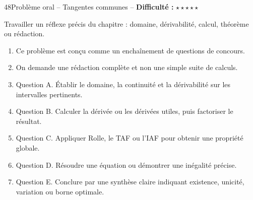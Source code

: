 \documentclass[11pt,a4paper]{article}
\newcommand{\etoiles}[1]{\textbf{Difficulté :} #1}
\begin{document}
\begin{exobox}{48}{Problème oral -- Tangentes communes -- \etoiles{$\star\star\star\star\star$}}

\begin{objectifbox}
Travailler un réflexe précis du chapitre : domaine, dérivabilité, calcul, théorème ou rédaction.
\end{objectifbox}

\begin{enumerate}

\item Ce problème est conçu comme un enchaînement de questions de concours.

\item On demande une rédaction complète et non une simple suite de calculs.

\item Question A. Établir le domaine, la continuité et la dérivabilité sur les intervalles pertinents.

\item Question B. Calculer la dérivée ou les dérivées utiles, puis factoriser le résultat.

\item Question C. Appliquer Rolle, le TAF ou l'IAF pour obtenir une propriété globale.

\item Question D. Résoudre une équation ou démontrer une inégalité précise.

\item Question E. Conclure par une synthèse claire indiquant existence, unicité, variation ou borne optimale.

\end{enumerate}

\end{exobox}
\end{document}
